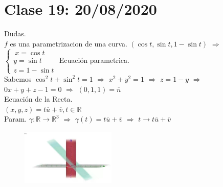 \documentclass[secnumarabic,balancelastpage,amsmath,amssymb]{article}
\theoremstyle{remark}
\theoremstyle{definition}
\theoremstyle{prop}
\begin{document}
\section{Clase 19: 20/08/2020}
Dudas. \\
$f$ es una parametrizacion de una curva. $(\cos t, \sin t, 1-\sin t)$ $\Rightarrow$
$\left \{
      \begin{array}{rcl}
          \ x=\cos t\\
          y=\sin t \\ 
         z=1-\sin t 
      \end{array}
   \right . $  
Ecuación parametrica.\\
Sabemos $\cos ^{2}t+\sin^{2}t=1$ $\Rightarrow$ $x^{2}+y^{2}=1$ $\Rightarrow$ $z=1-y$ $\Rightarrow$ $0x+y+z-1=0$ $\Rightarrow$ $(0,1,1)= \overline{n}$\\

Ecuación de la Recta.\\
$(x,y,z)=t \overline{u}+ \overline{v}, t\in \mathbb{R}$\\
Param. $\gamma: \mathbb{R}\rightarrow\mathbb{R}^{3}$ $\Rightarrow$ $\gamma(t)=t\overline{u}+\overline{v}$ $\Rightarrow$ $t\rightarrow t\overline{u}+\overline{v}$

\begin{figure}[h!]
\centering
\includegraphics[width=0.4\textwidth]{cap1.PNG}
\label{fig:fig6.}
\end{figure}
\end{document}
